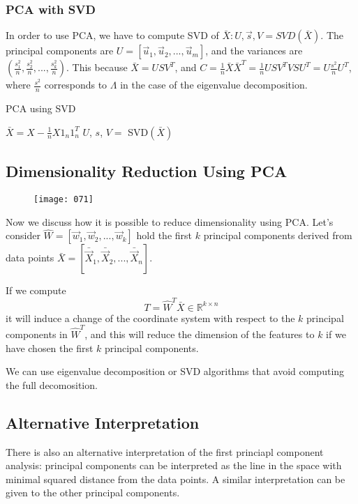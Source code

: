 \subsubsection{PCA with SVD}
In order to use PCA, we have to compute SVD of \(\bar{X}: U, \vec{s}, V = SVD(\bar{X})\). The principal components are \(U = \left[ \vec{u}_1, \vec{u}_2, ..., \vec{u}_m \right]\), and the variances are \(\left( \frac {s_1^2} n, \frac {s_2^2} n, ...,  \frac {s_k^2} n \right)\). This because \(\bar{X} = USV^T\), and \(C = \frac 1 n \bar{X} \bar{X}^T = \frac 1 n USV^T VSU^T = U \frac {s^2} n U^T\), where \(\frac {s^2} n\) corresponds to \(\Lambda\) in the case of the eigenvalue decomposition.
\begin{algorithm}
    \caption{PCA using SVD}
    $\bar X = X - \frac 1 n X 1_n 1_n^T$\;
    $U$, $s$, $V = $ SVD$(\bar X)$\;
\end{algorithm}
\subsection{Dimensionality Reduction Using PCA}
\begin{wrapfigure}{l}{0.35\textwidth}
    \begin{center}
        \texttt{[image: 071]}
        \caption{}
    \end{center}
    \label{fig:071}
\end{wrapfigure}
Now we discuss how it is possible to reduce dimensionality using PCA. Let's consider \(\hat{W} = \left[\vec{w}_1, \vec{w}_2, ..., \vec{w}_k \right]\) hold the first \(k\) principal components derived from data points \(\bar{X} = \left[\bar{\vec{X}}_1, \bar{\vec{X}}_2, ..., \bar{\vec{X}}_n \right]\).

If we compute
\begin{equation}
    T = \hat{W}^T \bar{X} \in \mathbb{R}^{k \times n}
\end{equation}
it will induce a change of the coordinate system with respect to the \(k\) principal components in \(\hat{W}^T\), and this will reduce the dimension of the features to \(k\) if we have chosen the first \(k\) principal components.

We can use eigenvalue decomposition or SVD algorithms that avoid computing the full decomosition.

\subsection{Alternative Interpretation}
There is also an alternative interpretation of the first princiapl component analysis: principal components can be interpreted as the line in the space with minimal squared distance from the data points. A similar interpretation can be given to the other principal components.

